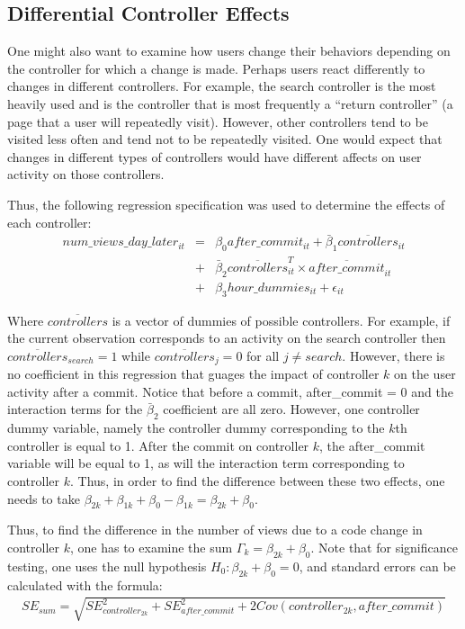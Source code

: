 \documentclass[12pt]{article}
\begin{document}
\subsection{Differential Controller Effects}

One might also want to examine how users change their behaviors depending on the controller for which a change is made. Perhaps users react differently to changes in different controllers. For example, the search controller is the most heavily used and is the controller that is most frequently a ``return controller'' (a page that a user will repeatedly visit). However, other controllers tend to be visited less often and tend not to be repeatedly visited. One would expect that changes in different types of controllers would have different affects on user activity on those controllers. 

Thus, the following regression specification was used to determine the effects of each controller:
\begin{eqnarray}
num\_views\_day\_later_{it} &=& \beta_0 after\_commit_{it} + \bar{\beta}_1 \overline{controllers}_{it} \\ \nonumber
&+& \bar{\beta}_2 \overline{controllers}_{it}^T \times \overline{after\_commit}_{it} \\ \nonumber
&+& \beta_3 hour\_dummies_{it} + \epsilon_{it}
\end{eqnarray}

Where $\overline{controllers}$ is a vector of dummies of possible controllers. For example, if the current observation corresponds to an activity on the search controller then $\overline{controllers}_{search} = 1$ while $\overline{controllers}_j = 0$ for all $j \neq search$. However, there is no coefficient in this regression that guages the impact of controller $k$ on the user activity after a commit. Notice that before a commit, after\_commit = 0 and the interaction terms for the $\bar{\beta}_2$ coefficient are all zero. However, one controller dummy variable, namely the controller dummy corresponding to the $k$th controller is equal to 1. After the commit on controller $k$, the after\_commit variable will be equal to 1, as will the interaction term corresponding to controller $k$. Thus, in order to find the difference between these two effects, one needs to take $\beta_{2k} + \beta_{1k} + \beta_0 - \beta_{1k} = \beta_{2k} + \beta_0$. 

Thus, to find the difference in the number of views due to a code change in controller $k$, one has to examine the sum $\Gamma_k = \beta_{2k} + \beta_0$. Note that for significance testing, one uses the null hypothesis $H_0: \beta_{2k} + \beta_0 = 0$, and standard errors can be calculated with the formula:
\begin{eqnarray}
SE_{sum} = \sqrt{ SE_{controller_{2k}}^2 + SE_{after\_commit}^2 + 2 Cov(controller_{2k}, after\_commit)}
\end{eqnarray}
\end{document}
